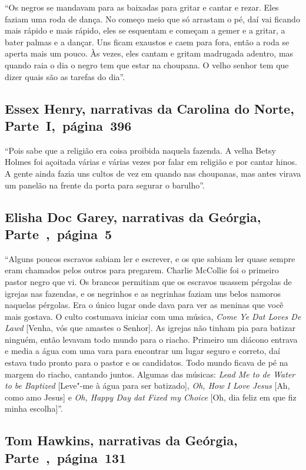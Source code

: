 ``Os negros se mandavam para as baixadas para gritar e cantar e rezar.
Eles faziam uma roda de dança. No começo meio que só arrastam o pé, daí
vai ficando mais rápido e mais rápido, eles se esquentam e começam a
gemer e a gritar, a bater palmas e a dançar. Uns ficam exaustos e caem
para fora, então a roda se aperta mais um pouco. Às vezes, eles cantam e
gritam madrugada adentro, mas quando raia o dia o negro tem que estar na
choupana. O velho senhor tem que dizer quais são as tarefas do dia''.

\subsection{Essex Henry, narrativas da Carolina do Norte, Parte~I,~página~396}
\label{ref137}

``Pois sabe que a religião era coisa proibida naquela fazenda. A velha
Betsy Holmes foi açoitada várias e várias vezes por falar em religião e
por cantar hinos. A gente ainda fazia uns cultos de vez em quando nas
choupanas, mas antes virava um panelão na frente da porta para segurar o
barulho''.

\subsection{Elisha Doc Garey, narrativas da Geórgia, Parte~,~página~5} \label{ref100}

``Alguns poucos escravos sabiam ler e escrever, e os que sabiam ler
quase sempre eram chamados pelos outros para pregarem. Charlie McCollie
foi o primeiro pastor negro que vi. Os brancos permitiam que os escravos
usassem pérgolas de igrejas nas fazendas, e os negrinhos e as negrinhas
faziam uns belos namoros naquelas pérgolas. Era o único lugar onde dava
para ver as meninas que você mais gostava. O culto costumava iniciar com
uma música, \emph{Come Ye Dat Loves De Lawd} {[}Venha, vós que amastes o
Senhor{]}. As igrejas não tinham pia para batizar ninguém, então
levavam todo mundo para o riacho. Primeiro um diácono entrava e media a
água com uma vara para encontrar um lugar seguro e correto, daí estava
tudo pronto para o pastor e os candidatos. Todo mundo ficava de pé na
margem do riacho, cantando juntos. Algumas das músicas: \emph{Lead Me to de
Water to be Baptized} {[}Leve"-me à água para ser batizado{]}, \emph{Oh, How
I Love Jesus} {[}Ah, como amo Jesus{]} e \emph{Oh, Happy Day dat Fixed my
Choice} {[}Oh, dia feliz em que fiz minha escolha{]}''.

\subsection{Tom Hawkins, narrativas da Geórgia, Parte~,~página~131}
\label{ref128}

